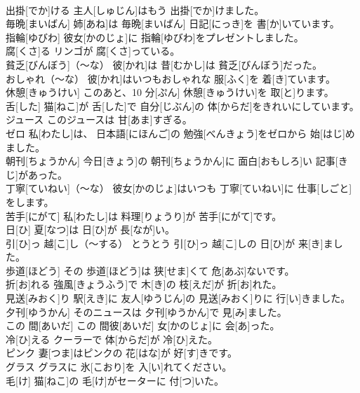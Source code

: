 \documentclass[8pt]{extreport}
\begin{document}
\begin{CJK}{UTF8}{min}
\\	出掛[でか]ける	主人[しゅじん]はもう 出掛[でか]けました。		
\\	毎晩[まいばん]	姉[あね]は 毎晩[まいばん] 日記[にっき]を 書[か]いています。		
\\	指輪[ゆびわ]	彼女[かのじょ]に 指輪[ゆびわ]をプレゼントしました。		
\\	腐[くさ]る	リンゴが 腐[くさ]っている。		
\\	貧乏[びんぼう]（～な）	彼[かれ]は 昔[むかし]は 貧乏[びんぼう]だった。		
\\	おしゃれ（～な）	彼[かれ]はいつもおしゃれな 服[ふく]を 着[き]ています。		
\\	休憩[きゅうけい]	このあと、10 分[ぷん] 休憩[きゅうけい]を 取[と]ります。		
\\	舌[した]	猫[ねこ]が 舌[した]で 自分[じぶん]の 体[からだ]をきれいにしています。		
\\	ジュース	このジュースは 甘[あま]すぎる。		
\\	ゼロ	私[わたし]は、 日本語[にほんご]の 勉強[べんきょう]をゼロから 始[はじ]めました。		
\\	朝刊[ちょうかん]	今日[きょう]の 朝刊[ちょうかん]に 面白[おもしろ]い 記事[きじ]があった。		
\\	丁寧[ていねい]（～な）	彼女[かのじょ]はいつも 丁寧[ていねい]に 仕事[しごと]をします。		
\\	苦手[にがて]	私[わたし]は 料理[りょうり]が 苦手[にがて]です。		
\\	日[ひ]	夏[なつ]は 日[ひ]が 長[なが]い。		
\\	引[ひ]っ 越[こ]し（～する）	とうとう 引[ひ]っ 越[こ]しの 日[ひ]が 来[き]ました。		
\\	歩道[ほどう]	その 歩道[ほどう]は 狭[せま]くて 危[あぶ]ないです。		
\\	折[お]れる	強風[きょうふう]で 木[き]の 枝[えだ]が 折[お]れた。		
\\	見送[みおく]り	駅[えき]に 友人[ゆうじん]の 見送[みおく]りに 行[い]きました。		
\\	夕刊[ゆうかん]	そのニュースは 夕刊[ゆうかん]で 見[み]ました。		
\\	この 間[あいだ]	この 間彼[あいだ] 女[かのじょ]に 会[あ]った。		
\\	冷[ひ]える	クーラーで 体[からだ]が 冷[ひ]えた。		
\\	ピンク	妻[つま]はピンクの 花[はな]が 好[す]きです。		
\\	グラス	グラスに 氷[こおり]を 入[い]れてください。		
\\	毛[け]	猫[ねこ]の 毛[け]がセーターに 付[つ]いた。		

\end{CJK}
\end{document}
